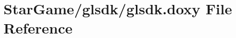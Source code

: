 \hypertarget{glsdk_8doxy}{\section{Star\-Game/glsdk/glsdk.doxy File Reference}
\label{glsdk_8doxy}
}
